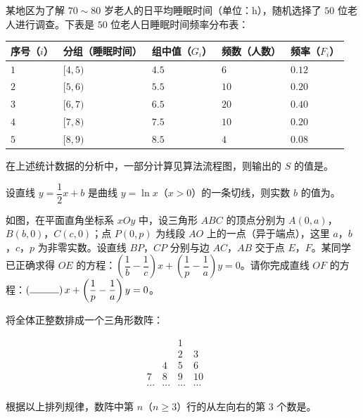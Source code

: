 \begin{question}
某地区为了解 $70\sim80$ 岁老人的日平均睡眠时间（单位：h），随机选择了 $50$ 位老人进行调查。下表是 $50$ 位老人日睡眠时间频率分布表：

\begin{center}
\begin{tabular}{lllll}
\toprule
序号（$i$） & 分组（睡眠时间） & 组中值（$G_i$） & 频数（人数） & 频率（$F_i$） \\
\midrule
$1$ & $[4,5)$ & $4.5$ & $6$ & $0.12$ \\
$2$ & $[5,6)$ & $5.5$ & $10$ & $0.20$ \\
$3$ & $[6,7)$ & $6.5$ & $20$ & $0.40$ \\
$4$ & $[7,8)$ & $7.5$ & $10$ & $0.20$ \\
$5$ & $[8,9)$ & $8.5$ & $4$ & $0.08$ \\
\bottomrule
\end{tabular}
\end{center}

在上述统计数据的分析中，一部分计算见算法流程图，则输出的 $S$ 的值是\gkblank{}。
\nopagebreak[4]
\begin{center}\end{center}
\nopagebreak[4]
\end{question}
\begin{question}
设直线 $y=\dfrac12x+b$ 是曲线 $y=\ln x$（$x>0$）的一条切线，则实数 $b$ 的值为\gkblank{}。

\end{question}
\begin{question}
如图，在平面直角坐标系 $xOy$ 中，设三角形 $ABC$ 的顶点分别为 $A(0,a)$，$B(b,0)$，$C(c,0)$；点 $P(0,p)$ 为线段 $AO$ 上的一点（异于端点），这里 $a$，$b$，$c$，$p$ 为非零实数。设直线 $BP$，$CP$ 分别与边 $AC$，$AB$ 交于点 $E$，$F$。某同学已正确求得 $OE$ 的方程：$\left(\dfrac1b-\dfrac1c\right)x+\left(\dfrac1p-\dfrac1a\right)y=0$。请你完成直线 $OF$ 的方程：$\left(\rule{3em}{0.4pt}\right)x+\left(\dfrac1p-\dfrac1a\right)y=0$。

\end{question}
\begin{question}
将全体正整数排成一个三角形数阵：

\nopagebreak[4]
\[\begin{array}{cccccc}&&1&&&\\&&2&3&&\\&4&5&6&&\\7&8&9&10&&\\\cdots&\cdots&\cdots&\cdots&&\end{array}\]

根据以上排列规律，数阵中第 $n$（$n\geqslant3$）行的从左向右的第 $3$ 个数是\gkblank{}。

\end{question}
